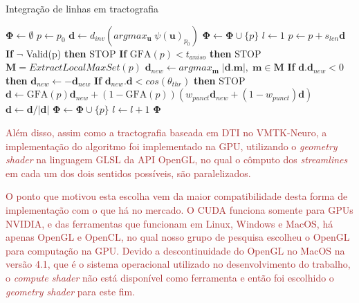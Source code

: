 \documentclass[
    12pt,                %
    oneside,            %
    a4paper,            %
    english,            %
    french,                %
    spanish,            %
    brazil                %
    ]{abntex2}
\begin{document}
\begin{algorithm}
\caption{Integração de linhas em tractografia}
\label{psc::tractography}
\begin{algorithmic}[1]
\State $\mathbf{\Phi} \gets \emptyset$
\State $p \gets p_0$
\State $\mathbf{d} \gets d_{inv}(argmax_\mathbf{u} \; \psi(\mathbf{u})_{p_0})$
\State $\mathbf{\Phi} \gets \mathbf{\Phi} \cup  \{p\}$ 
\State $l \gets 1$
\State $p \gets p + s_{len} \mathbf{d}$
\State \textbf{If} $\neg$ Valid(p) \textbf{then} STOP \label{alg:psc_valid} %
\State \textbf{If} $\text{GFA}(p) < t_{aniso}$  \textbf{then} STOP \label{alg::GFA}%
\State $\mathbf{M} = ExtractLocalMaxSet(p)$ \label{alg::extractLocalMaxSet}
\State $\mathbf{d}_{new} \gets argmax_{\textbf{m}} \; |\mathbf{d}.\mathbf{m}|, \; \mathbf{m} \in \mathbf{M}$
\State \textbf{If} $\mathbf{d}.\mathbf{d}_{new} < 0$  \textbf{then} $\mathbf{d}_{new} \gets -\mathbf{d}_{new}$%
\State \textbf{If} $\mathbf{d}_{new}.\mathbf{d} < cos(\theta_{thr})$ \textbf{then} STOP%
\State $\mathbf{d} \gets \text{GFA}(p)\mathbf{d}_{new} + (1 - \text{GFA}(p))(w_{punct}\mathbf{d}_{new} + (1 - w_{punct})\mathbf{d})$
\State $\mathbf{d} \gets \mathbf{d}/|\mathbf{d}|$
\State $\mathbf{\Phi} \gets \mathbf{\Phi} \cup  \{p\}$
\State $l \gets l + 1$
\EndWhile
\State \Return $\mathbf{\Phi}$
\EndFunction
\end{algorithmic}
\end{algorithm}

\textcolor{brown}{
Além disso, assim como a tractografia baseada em DTI no VMTK-Neuro, a implementação do algoritmo foi implementado na GPU, utilizando o \textit{geometry shader} na linguagem GLSL da API OpenGL, no qual o cômputo dos \textit{streamlines} em cada um dos dois sentidos possíveis, são paralelizados.
}

\textcolor{brown}{
O ponto que motivou esta escolha vem da maior compatibilidade desta forma de implementação com o que há no mercado. O CUDA funciona somente para GPUs NVIDIA, e das ferramentas que funcionam em Linux, Windows e MacOS, há apenas OpenGL e OpenCL, no qual nosso grupo de pesquisa escolheu o OpenGL para computação na GPU. Devido a descontinuidade do OpenGL no MacOS na versão 4.1, que é o sistema operacional utilizado no desenvolvimento do trabalho, o \textit{compute shader} não está disponível como ferramenta e então foi escolhido o \textit{geometry shader} para este fim.
}
\end{document}

